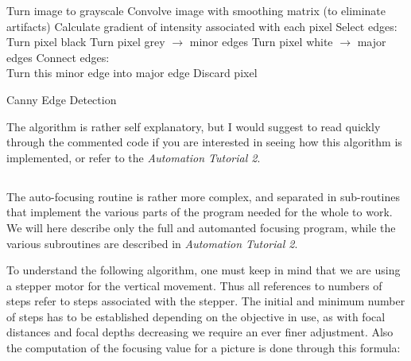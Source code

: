 \documentclass[a4paper]{article}
\begin{document}
		\vspace{12pt}
		\begin{algorithm}[H]
			\dontprintsemicolon
			
			\Begin
			{
				{
					Turn image to grayscale\;
				}
				\BlankLine
				Convolve image with smoothing matrix (to eliminate artifacts)\;
				Calculate gradient of intensity associated with each pixel\;{}
				\BlankLine
				Select edges:\\
				{
					{Turn pixel black\;}
					{Turn pixel grey $\rightarrow$ minor edges\;}
					{Turn pixel white $\rightarrow$ major edges\;}
				}
				\BlankLine
				Connect edges:\\	
				{
					{Turn this minor edge into major edge\;}
					{Discard pixel\;}
				}
			}
			\caption{Canny Edge Detection}				
		\end{algorithm}
		\vspace{12pt}
		
			The algorithm is rather self explanatory, but I would suggest to read quickly through the commented code if you are interested in seeing how this algorithm is implemented, or refer to the \emph{Automation Tutorial 2}.
	
	\subsection*{}
		
			The auto-focusing routine is rather more complex, and separated in sub-routines that implement the various parts of the program needed for the whole to work.
			We will here describe only the full and automanted focusing program, while the various subroutines are described in \emph{Automation Tutorial 2}.
			
			To understand the following algorithm, one must keep in mind that we are using a stepper motor for the vertical movement.
			Thus all references to numbers of steps refer to steps associated with the stepper.
			The initial and minimum number of steps has to be established depending on the objective in use, as with focal distances and focal depths decreasing we require an ever finer adjustment.
			Also the computation of the focusing value for a picture is done through this formula:
		
\end{document}
